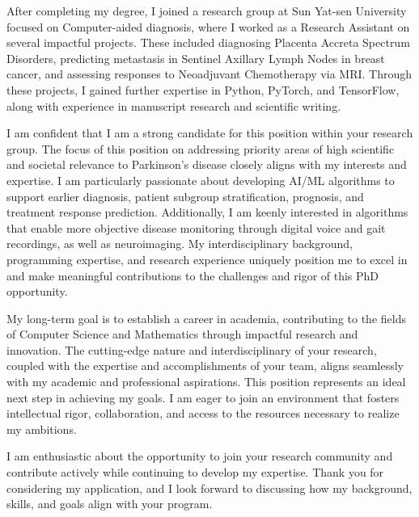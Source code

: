 \documentclass[11pt,a4paper, final]{moderncv}
\newcommand{\spacesubsection}{\vspace{0.2cm}}
\begin{document}
After completing my degree, 
I joined a research group at Sun Yat-sen University focused on Computer-aided diagnosis, 
where I worked as a Research Assistant on several impactful projects. 
These included diagnosing Placenta Accreta Spectrum Disorders, 
predicting metastasis in Sentinel Axillary Lymph Nodes in breast cancer, 
and assessing responses to Neoadjuvant Chemotherapy via MRI. 
Through these projects, I gained further expertise in Python, PyTorch, and TensorFlow, 
along with experience in manuscript research and scientific writing.

I am confident that I am a strong candidate for this position within your research group. 
The focus of this position on addressing priority areas of high scientific and societal relevance to Parkinson's disease 
closely aligns with my interests and expertise. 
I am particularly passionate about developing AI/ML algorithms to support earlier diagnosis, 
patient subgroup stratification, prognosis, and treatment response prediction. 
Additionally, I am keenly interested in algorithms that enable more objective disease monitoring 
through digital voice and gait recordings, as well as neuroimaging.  
My interdisciplinary background, programming expertise, and research experience uniquely position me 
to excel in and make meaningful contributions to the challenges and rigor of this PhD opportunity.

My long-term goal is to establish a career in academia, 
contributing to the fields of Computer Science and Mathematics through impactful research and innovation. 
The cutting-edge nature and interdisciplinary of your research, 
coupled with the expertise and accomplishments of your team, 
aligns seamlessly with my academic and professional aspirations. 
This position represents an ideal next step in achieving my goals. 
I am eager to join an environment that fosters intellectual rigor, collaboration, 
and access to the resources necessary to realize my ambitions.

I am enthusiastic about the opportunity to join your research community 
and contribute actively while continuing to develop my expertise. 
Thank you for considering my application, 
and I look forward to discussing how my background, skills, and goals align with your program.


\makeletterclosing
\end{document}
